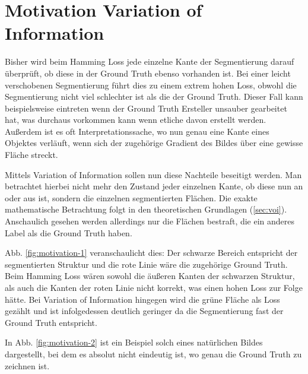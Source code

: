 \section{Motivation Variation of Information}\label{sec:motivation}

Bisher wird beim Hamming Loss jede einzelne Kante der Segmentierung darauf überprüft, ob diese in der Ground Truth ebenso vorhanden ist. Bei einer leicht verschobenen Segmentierung führt dies zu einem extrem hohen Loss, obwohl die Segmentierung nicht viel schlechter ist als die der Ground Truth. Dieser Fall kann beispielsweise eintreten wenn der Ground Truth Ersteller unsauber gearbeitet hat, was durchaus vorkommen kann wenn etliche davon erstellt werden. Außerdem ist es oft Interpretationssache, wo nun genau eine Kante eines Objektes verläuft, wenn sich der zugehörige Gradient des Bildes über eine gewisse Fläche streckt. 

Mittels Variation of Information sollen nun diese Nachteile beseitigt werden. Man betrachtet hierbei nicht mehr den Zustand jeder einzelnen Kante, ob diese nun an oder aus ist, sondern  die einzelnen segmentierten Flächen. Die exakte mathematische Betrachtung folgt in den theoretischen Grundlagen (\ref{sec:voi}). Anschaulich gesehen werden allerdings nur die Flächen bestraft, die ein anderes Label als die Ground Truth haben.

Abb. \ref{fig:motivation-1} veranschaulicht dies: Der schwarze Bereich entspricht der segmentierten Struktur und die rote Linie wäre die zugehörige Ground Truth. Beim Hamming Loss wären sowohl die äußeren Kanten der schwarzen Struktur, als auch die Kanten der roten Linie nicht korrekt, was einen hohen Loss zur Folge hätte. Bei Variation of Information hingegen wird die grüne Fläche als Loss gezählt und ist infolgedessen deutlich geringer da die Segmentierung fast der Ground Truth entspricht.

In Abb. \ref{fig:motivation-2} ist ein Beispiel solch eines natürlichen Bildes dargestellt, bei dem es absolut nicht eindeutig ist, wo genau die Ground Truth zu zeichnen ist.


\begin{figure}[H]
	\centering
	\hfill
\end{figure}
\vspace{-0.5cm}
\label{fig:motivation}


